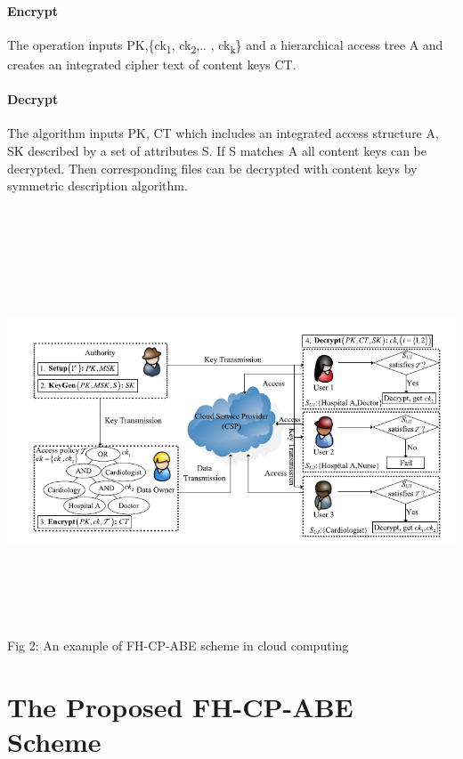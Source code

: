 \documentclass[a4paper,12pt]{article}
\begin{document}
\paragraph{Encrypt}The operation inputs PK,\{ck\textsubscript{1}, ck\textsubscript{2},.. , ck\textsubscript{k}\} and a hierarchical access tree A and creates an integrated cipher text of content keys CT.
\paragraph{Decrypt}The algorithm inputs PK, CT which includes an integrated access structure A, SK described by a set of attributes S. If S matches A all content keys can be decrypted. Then corresponding files can be decrypted with content keys by symmetric description algorithm.\\ \\ \\

\includegraphics[width=18cm,height=12cm]{fig2.PNG}
Fig 2: An example of FH-CP-ABE scheme in cloud computing
\newpage
\section{The Proposed FH-CP-ABE Scheme}
\end{document}
